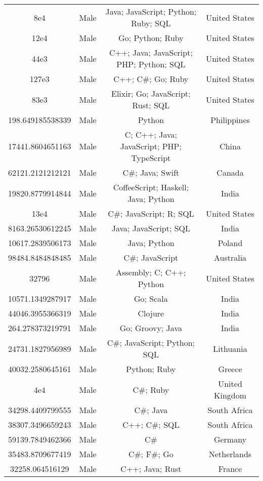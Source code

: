 \begin{center}
\begin{tabular}{ |c|c|c|c| }
8e4  &  Male  &  Java; JavaScript; Python; Ruby; SQL  &  United States  \\ 
12e4  &  Male  &  Go; Python; Ruby  &  United States  \\ 
44e3  &  Male  &  C++; Java; JavaScript; PHP; Python; SQL  &  United States  \\ 
127e3  &  Male  &  C++; C\#; Go; Ruby  &  United States  \\ 
83e3  &  Male  &  Elixir; Go; JavaScript; Rust; SQL  &  United States  \\ 
198.649185538339  &  Male  &  Python  &  Philippines  \\ 
17441.8604651163  &  Male  &  C; C++; Java; JavaScript; PHP; TypeScript  &  China  \\ 
62121.2121212121  &  Male  &  C\#; Java; Swift  &  Canada  \\ 
19820.8779914844  &  Male  &  CoffeeScript; Haskell; Java; Python  &  India  \\ 
13e4  &  Male  &  C\#; JavaScript; R; SQL  &  United States  \\ 
8163.26530612245  &  Male  &  Java; JavaScript; SQL  &  India  \\ 
10617.2839506173  &  Male  &  Java; Python  &  Poland  \\ 
98484.8484848485  &  Male  &  C\#; JavaScript  &  Australia  \\ 
32796  &  Male  &  Assembly; C; C++; Python  &  United States  \\ 
10571.1349287917  &  Male  &  Go; Scala  &  India  \\ 
44046.3955366319  &  Male  &  Clojure  &  India  \\ 
264.278373219791  &  Male  &  Go; Groovy; Java  &  India  \\ 
24731.1827956989  &  Male  &  C\#; JavaScript; Python; SQL  &  Lithuania  \\ 
40032.2580645161  &  Male  &  Python; Ruby  &  Greece  \\ 
4e4  &  Male  &  C\#; Ruby  &  United Kingdom  \\ 
34298.4409799555  &  Male  &  C\#; Java  &  South Africa  \\ 
38307.3496659243  &  Male  &  C++; C\#; SQL  &  South Africa  \\ 
59139.7849462366  &  Male  &  C\#  &  Germany  \\ 
35483.8709677419  &  Male  &  C\#; F\#; Go  &  Netherlands  \\ 
32258.064516129  &  Male  &  C++; Java; Rust  &  France  \\ 

\end{tabular}
\end{center}
